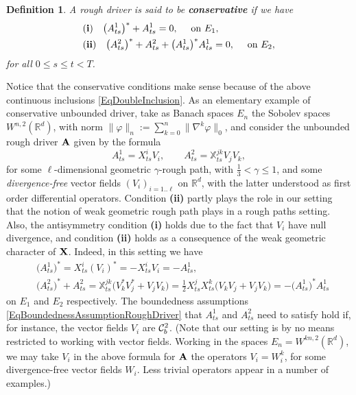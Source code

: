 \documentclass[11pt,a4paper]{amsart}
\newcommand{\RR}{\mathbb{R}}  \newcommand{\CC}{\mathbb{C}}  \newcommand{\LL}{\mathbb{L}}  \newcommand{\WW}{\mathbb{W}}
\newcommand{\bbX}{\mathbb{X}}
\renewcommand{\leq}{\leqslant}
\newtheorem{defn}[thm]{ \hspace{-0.3cm} {\sc Definition}}%
\numberwithin{equation}{section} %
\begin{document}
\begin{defn}
A rough driver is said to be \textbf{\emph{conservative}} if we have 
\begin{equation*}
\begin{split}
&{\bf (i)}\quad \big(A^1_{ts}\big)^{\ast} +A^1_{ts} = 0, \quad \textrm{ on } E_1, \\
&{\bf (ii)}\quad \big(A^2_{ts}\big)^{\ast} + A^2_{ts} + \big(A_{ts}^1\big)^{\ast} A^1_{ts} = 0, \quad \textrm{ on } E_2,
\end{split}
\end{equation*}
for all $0\leq s\leq t<T$.
\end{defn}
Notice that the conservative conditions make sense because of the above continuous inclusions \eqref{EqDoubleInclusion}. As an elementary example of conservative unbounded driver, take as Banach spaces $E_n$ the Sobolev spaces $W^{n,2}(\RR^d)$, with norm $\|\varphi\|_n := \sum_{k=0}^n \big\|\nabla^k\varphi\big\|_0$, and consider the unbounded rough driver $\bf A$  given by the formula
\begin{equation}
\label{EqRoughDriverRoughPath}
A^1_{ts} = X^i_{ts}V_i,  \quad\quad A^2_{ts} = \bbX^{jk}_{ts}V_jV_k,
\end{equation}
for some $\ell$-dimensional geometric $\gamma$-rough path, with $\frac{1}{3}<\gamma\leq 1$, and some \emph{divergence-free} vector fields $(V_i)_{i=1..\ell}$ on $\RR^d$, with the latter understood as first order differential operators. Condition {\bf (ii)} partly plays the role in our setting that the notion of weak geometric rough path plays in a rough paths setting. Also, the antisymmetry condition {\bf (i)} holds due to the fact that $V_i$ have null divergence, and condition {\bf (ii)} holds as a consequence of the weak geometric character of ${\bf X}$. Indeed, in this setting we have
\begin{equation*}
\begin{split}
&\big(A^1_{ts}\big)^* = X^i_{ts}(V_i)^* = - X^i_{ts} V_i = -A^1_{ts}, \\
&\big(A^2_{ts}\big)^* + A^2_{ts} =  \bbX^{jk}_{ts}\big(V_k^*V_j^*+V_j V_k\big) = \frac1 2  X^j_{ts}X^k_{ts} \big(V_kV_j +V_j V_k\big) = - \big(A^1_{ts}\big)^* A^1_{ts}
\end{split}
\end{equation*}
on $E_1$ and $E_2$ respectively. The boundedness assumptions \eqref{EqBoundednessAssumptionRoughDriver} that $A^1_{ts}$ and $A^2_{ts}$ need to satisfy hold if, for instance, the vector fields $V_i$ are $\mathcal{C}^2_b$. (Note that our setting is by no means restricted to working with vector fields. Working in the spaces $E_n = W^{kn,2}(\RR^d)$, we may take $V_i$ in the above formula for $\bf A$ the operators $V_i=W_i^k$, for some divergence-free vector fields $W_i$. Less trivial operators appear in a number of examples.)
\end{document}
